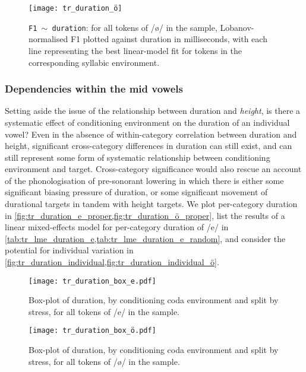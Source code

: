 \begin{figure}[ht]
  \centering
  \texttt{[image: tr\_duration\_ö]}
  \caption[\texttt{F1 $\sim$ duration} correlation for /ø/, split by environment.]{\texttt{F1 $\sim$ duration}: for all tokens of /ø/ in the sample, Lobanov-normalised F1 plotted against duration in milliseconds, with each line representing the best linear-model fit for tokens in the corresponding syllabic environment.}
  \label{fig:trdurationö}
\end{figure}

\subsubsection{Dependencies within the mid vowels} Setting aside the issue of the relationship between duration and \emph{height}, is there a systematic effect of conditioning environment on the duration of an individual vowel? Even in the absence of within-category correlation between duration and height, significant cross-category differences in duration can still exist, and can still represent some form of systematic relationship between conditioning environment and target. Cross-category significance would also rescue an account of the phonologisation of pre-sonorant lowering in which there is either some significant biasing pressure of duration, or some significant movement of durational targets in tandem with height targets. We plot per-category duration in \cref{fig:tr_duration_e_proper,fig:tr_duration_ö_proper}, list the results of a linear mixed-effects model for per-category duration of /e/ in \cref{tab:tr_lme_duration_e,tab:tr_lme_duration_e_random}, and consider the potential for individual variation in \cref{fig:tr_duration_individual,fig:tr_duration_individual_ö}.

\begin{figure}[ht]
  \texttt{[image: tr\_duration\_box\_e.pdf]}
  \caption[Duration by conditioning category for /e/.]{Box-plot of duration, by conditioning coda environment and split by stress, for all tokens of /e/ in the sample.}
  \label{fig:tr_duration_e_proper}
\end{figure}

\begin{figure}[ht]
  \texttt{[image: tr\_duration\_box\_ö.pdf]}
  \caption[Duration by conditioning category for /ø/.]{Box-plot of duration, by conditioning coda environment and split by stress, for all tokens of /ø/ in the sample.}
  \label{fig:tr_duration_ö_proper}
\end{figure}

